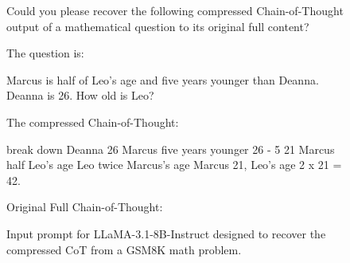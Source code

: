 \begin{figure}[htbp]
\begin{tcolorbox}[colback=blue!5!white,colframe=blue!75!black,title=Input Prompt for CoT Recovery,fontupper=\footnotesize,fonttitle=\scriptsize]
Could you please recover the following compressed Chain-of-Thought output of a mathematical question to its original full content?

\vskip 0.1in

The question is: 

Marcus is half of Leo’s age and five years younger than Deanna. Deanna is 26. How old is Leo?

\vskip 0.1in

The compressed Chain-of-Thought: 

break down Deanna 26 Marcus five years younger 26 - 5 21 Marcus half Leo's age Leo twice Marcus's age Marcus 21, Leo's age 2 x 21 = 42.

\vskip 0.1in

Original Full Chain-of-Thought:
\end{tcolorbox}
\vskip -0.1in
\caption{Input prompt for LLaMA-3.1-8B-Instruct designed to recover the compressed CoT from a GSM8K math problem.}
\vskip -0.1in
\label{fig:recovery-prompt}
\end{figure}